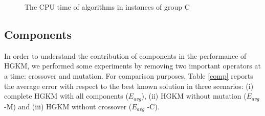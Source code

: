 \begin{figure}[H]
\caption{The CPU time of algorithms in instances of group C}
\label{fig:timeC}
\end{figure}

\subsection{Components}
\label{sec:components-section}
In order to understand the contribution of components in the performance of HGKM, we performed some experiments by removing two important operators at a time: crossover and mutation. For comparison purposes, Table \ref{comp} reports the average error with respect to the best known solution in three scenarios: (i) complete HGKM with all components ($E_{avg}$), (ii) HGKM without mutation ($E_{avg}$ -M) and (iii) HGKM without crossover ($E_{avg}$ -C).

